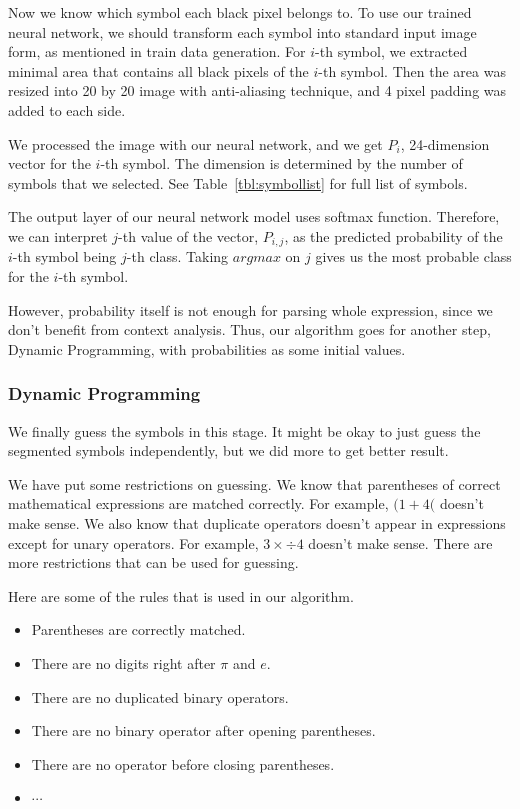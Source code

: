 \documentclass[10pt,twocolumn,letterpaper]{article}
\begin{document}
Now we know which symbol each black pixel belongs to.
To use our trained neural network, we should transform each symbol into standard input image form, as mentioned in train data generation.
For $i$-th symbol, we extracted minimal area that contains all black pixels of the $i$-th symbol.
Then the area was resized into 20 by 20 image with anti-aliasing technique, and 4 pixel padding was added to each side.

We processed the image with our neural network, and we get $P_i$, 24-dimension vector for the $i$-th symbol.
The dimension is determined by the number of symbols that we selected.
See Table~\ref{tbl:symbollist} for full list of symbols.

The output layer of our neural network model uses softmax function.
Therefore, we can interpret $j$-th value of the vector, $P_{i,j}$, as the predicted probability of the $i$-th symbol being $j$-th class.
Taking $argmax$ on $j$ gives us the most probable class for the $i$-th symbol.

However, probability itself is not enough for parsing whole expression, since we don't benefit from context analysis.
Thus, our algorithm goes for another step, Dynamic Programming, with probabilities as some initial values.

\subsubsection{Dynamic Programming}

We finally guess the symbols in this stage.
It might be okay to just guess the segmented symbols independently,
but we did more to get better result.

We have put some restrictions on guessing.
We know that parentheses of correct mathematical expressions are matched correctly.
For example, $(1 + 4($ doesn't make sense.
We also know that duplicate operators doesn't appear in expressions except for
unary operators. For example, $3 \times \div 4$ doesn't make sense.
There are more restrictions that can be used for guessing.

Here are some of the rules that is used in our algorithm.
\begin{itemize}
\item Parentheses are correctly matched.
\item There are no digits right after $\pi$ and $e$.
\item There are no duplicated binary operators.
\item There are no binary operator after opening parentheses.
\item There are no operator before closing parentheses.
\item $\cdots$
\end{itemize}
\end{document}
